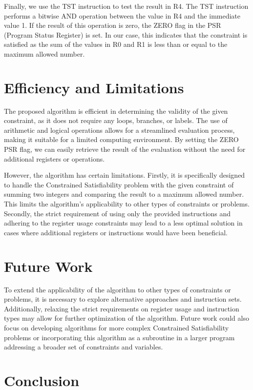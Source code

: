 Finally, we use the TST instruction to test the result in R4. The TST instruction performs a bitwise AND operation between the value in R4 and the immediate value 1. If the result of this operation is zero, the ZERO flag in the PSR (Program Status Register) is set. In our case, this indicates that the constraint is satisfied as the sum of the values in R0 and R1 is less than or equal to the maximum allowed number.

\section{Efficiency and Limitations}

The proposed algorithm is efficient in determining the validity of the given constraint, as it does not require any loops, branches, or labels. The use of arithmetic and logical operations allows for a streamlined evaluation process, making it suitable for a limited computing environment. By setting the ZERO PSR flag, we can easily retrieve the result of the evaluation without the need for additional registers or operations.

However, the algorithm has certain limitations. Firstly, it is specifically designed to handle the Constrained Satisfiability problem with the given constraint of summing two integers and comparing the result to a maximum allowed number. This limits the algorithm's applicability to other types of constraints or problems. Secondly, the strict requirement of using only the provided instructions and adhering to the register usage constraints may lead to a less optimal solution in cases where additional registers or instructions would have been beneficial.

\section{Future Work}

To extend the applicability of the algorithm to other types of constraints or problems, it is necessary to explore alternative approaches and instruction sets. Additionally, relaxing the strict requirements on register usage and instruction types may allow for further optimization of the algorithm. Future work could also focus on developing algorithms for more complex Constrained Satisfiability problems or incorporating this algorithm as a subroutine in a larger program addressing a broader set of constraints and variables.

\section{Conclusion}


